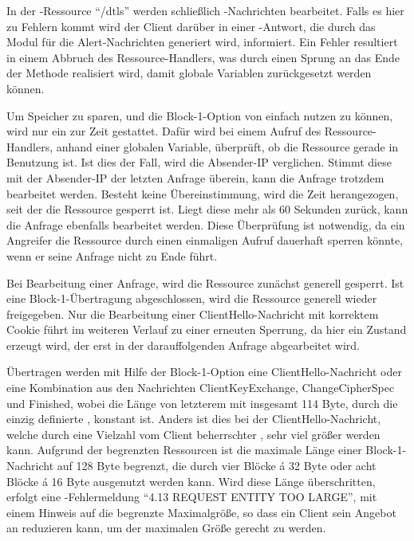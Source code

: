 In der -Ressource "`/dtls"' werden schließlich -Nachrichten bearbeitet. Falls es hier zu Fehlern kommt wird der Client darüber in einer
-Antwort, die durch das Modul für die Alert-Nachrichten generiert wird, informiert. Ein Fehler resultiert in einem Abbruch des Ressource-Handlers,
was durch einen Sprung an das Ende der Methode realisiert wird, damit globale Variablen zurückgesetzt werden können.

Um Speicher zu sparen, und die Block-1-Option von  einfach nutzen zu können, wird nur ein  zur Zeit gestattet. Dafür wird bei einem Aufruf des
Ressource-Handlers, anhand einer globalen Variable, überprüft, ob die Ressource gerade in Benutzung ist. Ist dies der Fall, wird die Absender-IP verglichen.
Stimmt diese mit der Absender-IP der letzten Anfrage überein, kann die Anfrage trotzdem bearbeitet werden. Besteht keine Übereinstimmung, wird die Zeit herangezogen,
seit der die Ressource gesperrt ist. Liegt diese mehr als 60 Sekunden zurück, kann die Anfrage ebenfalls bearbeitet werden. Diese Überprüfung ist notwendig, da
ein Angreifer die Ressource durch einen einmaligen Aufruf dauerhaft sperren könnte, wenn er seine Anfrage nicht zu Ende führt.

Bei Bearbeitung einer Anfrage, wird die Ressource zunächst generell gesperrt. Ist eine Block-1-Übertragung abgeschlossen, wird die Ressource generell wieder freigegeben.
Nur die Bearbeitung einer ClientHello-Nachricht mit korrektem Cookie führt im weiteren Verlauf zu einer erneuten Sperrung, da hier ein Zustand erzeugt wird, der erst
in der darauffolgenden Anfrage abgearbeitet wird.

Übertragen werden mit Hilfe der Block-1-Option eine ClientHello-Nachricht oder eine Kombination aus den Nachrichten ClientKeyExchange, ChangeCipherSpec und Finished,
wobei die Länge von letzterem mit insgesamt 114 Byte, durch die einzig definierte , konstant ist. Anders ist dies bei der ClientHello-Nachricht,
welche durch eine Vielzahl vom Client beherrschter , sehr viel größer werden kann. Aufgrund der begrenzten Ressourcen ist die maximale Länge einer
Block-1-Nachricht auf 128 Byte begrenzt, die durch vier Blöcke á 32 Byte oder acht Blöcke á 16 Byte ausgenutzt werden kann. Wird diese Länge überschritten, erfolgt
eine -Fehlermeldung "`4.13 REQUEST ENTITY TOO LARGE"', mit einem Hinweis auf die begrenzte Maximalgröße, so dass ein Client sein Angebot an 
reduzieren kann, um der maximalen Größe gerecht zu werden.

